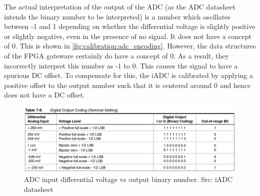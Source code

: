 The actual interpretation of the output of the ADC (as the ADC datasheet intends the binary number to be interpreted) is a number which oscillates between -1 and 1 depending on whether the differential voltage is slightly positive or slightly negative, even in the presence of no signal. It does not have a concept of 0. This is shown in \autoref{fig:calibration:adc_encoding}. However, the data structures of the FPGA gateware certainly do have a concept of 0. As a result, they incorrectly interpret this number as -1 to 0. This causes the signal to have a spurious DC offset. To compensate for this, the iADC is calibrated by applying a positive offset to the output number such that it is centered around 0 and hence does not have a DC offset.

\begin{figure}
  \centering
  \includegraphics[width=\textwidth]{./img/calibration/adc_encoding}
  \caption{ADC input differential voltage vs output binary number. Src: iADC datasheet}
  \label{fig:calibration:adc_encoding}
\end{figure}
